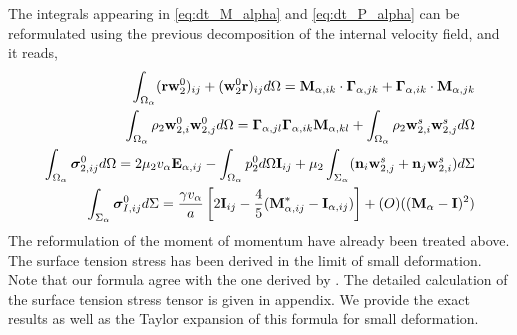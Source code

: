 The integrals appearing in \ref{eq:dt_M_alpha} and \ref{eq:dt_P_alpha} can be reformulated using the previous decomposition of the internal velocity field, and it reads, 
\begin{align}
    \int_{\Omega_\alpha} (\textbf{rw}_ 2^0 )_{ij}+ (\textbf{w}_2^0 \textbf{r})_{ij} d\Omega 
    = \textbf{M}_{\alpha,ik} \cdot \bm\Gamma_{\alpha,jk}
        +  \bm\Gamma_{\alpha,ik} \cdot \textbf{M}_{\alpha,jk}
    \\
    \int_{\Omega_\alpha} \rho_2 \textbf{w}_{2,i}^0\textbf{w}_{2,j}^0 d\Omega
    = \bm\Gamma_{\alpha,jl}\bm\Gamma_{\alpha,ik} \textbf{M}_{\alpha,kl}  
        +\int_{\Omega_\alpha} \rho_2 \textbf{w}_{2,i}^s\textbf{w}_{2,j}^s d\Omega
    \\
    \int_{\Omega_\alpha} \bm\sigma_{2,ij}^0 d\Omega
    =
    2 \mu_2 v_\alpha \textbf{E}_{\alpha,ij}
    - \int_{\Omega_\alpha} p_2^0 d\Omega \textbf{I}_{ij}
    + \mu_2 \int_{\Sigma_\alpha} (\textbf{n}_i \textbf{w}_{2,j}^s + \textbf{n}_j \textbf{w}_{2,i}^s) d\Sigma
    \\
    \int_{\Sigma_\alpha} \bm\sigma_{I,ij}^0 d\Sigma
    = \frac{\gamma v_\alpha }{a} \left[
        2\textbf{I}_{ij} 
        - \frac{4  }{5} (\textbf{M}_{\alpha,ij}^* - \textbf{I}_{\alpha,ij})
    \right]
    +\mathcal(O)((\textbf{M}_\alpha-\textbf{I})^2)\\
\end{align}
The reformulation of the moment of momentum have already been treated above. 
The surface tension stress has been derived in the limit of small deformation. 
Note that our formula agree with the one derived by \citet{lhuillier1987phenomenology}. 
The detailed calculation of the surface tension stress tensor is given in appendix. 
We provide the exact results as well as the Taylor expansion of this formula for small deformation. 


